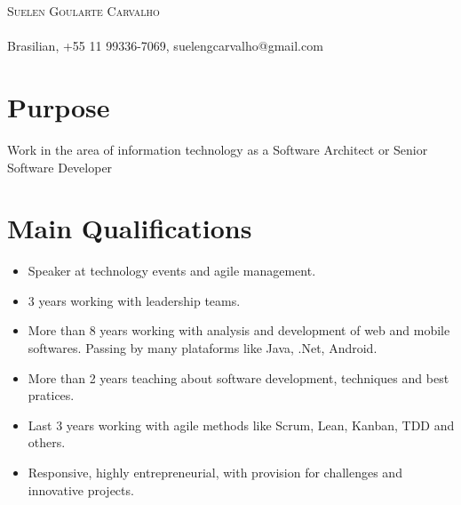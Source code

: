 \documentclass[a4paper, oneside, final]{article}
\begin{document}
\begin{center}
\textsc{\Huge{Suelen Goularte Carvalho}}\\
\ \\
Brasilian, +55 11 99336-7069, suelengcarvalho@gmail.com


\section{Purpose}
	Work in the area of information technology as a Software Architect or Senior Software Developer



\section{Main Qualifications}

\begin{itemize}
	\item Speaker at technology events and agile management.
	\item 3 years working with leadership teams.
	\item More than 8 years working with analysis and development of web and mobile softwares. Passing by many plataforms like Java, .Net, Android.
	\item More than 2 years teaching about software development, techniques and best pratices. 
	\item Last 3 years working with agile methods like Scrum, Lean, Kanban, TDD and others. 
	\item Responsive, highly entrepreneurial, with provision for challenges and innovative projects.\\
\end{itemize}


\end{center}
\end{document}

